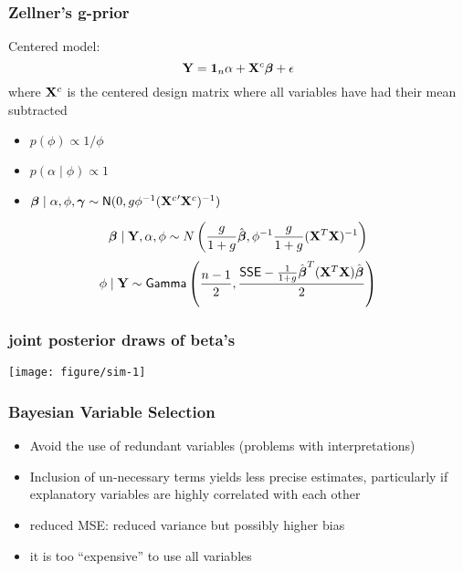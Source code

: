 \documentclass[handout]{beamer}\usepackage[]{graphicx}\usepackage[]{color}
\makeatletter
\def\maxwidth{ %
  \ifdim\Gin@nat@width>\linewidth
    \linewidth
  \else
    \Gin@nat@width
  \fi
}
\newenvironment{knitrout}{}{} %
\makeatother
\begin{document}
\begin{frame}\frametitle{Zellner's g-prior}
  Centered model:  $$\mathbf{Y} = \mathbf{1}_n \alpha + \mathbf{X}^c \boldsymbol{\beta} + \epsilon$$
  where $\mathbf{X}^c$ is the centered design matrix where all variables have
  had their mean subtracted \pause
\begin{itemize}
\item  $p(\phi) \propto 1/\phi$  \pause
\item   $p(\alpha \mid \phi) \propto 1$ \pause
\item  $\boldsymbol{\beta} \mid \alpha, \phi, \boldsymbol{\gamma} \sim \textsf{N}(0, g \phi^{-1}
  ({\mathbf{X}^c}^\prime \mathbf{X}^c)^{-1})$ \pause
\end{itemize}

$$\boldsymbol{\beta} \mid \mathbf{Y}, \alpha, \phi \sim N\left(\frac{g}{1 + g} \hat{\boldsymbol{\beta}}, \phi^{-1}\frac{g}{1 + g} (\mathbf{X}^T\mathbf{X})^{-1} \right)$$
$$ \phi \mid \mathbf{Y} \sim \textsf{Gamma} \left(\frac{n-1}{2}, \frac{\textsf{SSE} - \frac{1}{1 + g} \hat{\boldsymbol{\beta}}^T (\mathbf{X}^T\mathbf{X}) \hat{\boldsymbol{\beta}}}{2} \right) $$
\end{frame}

\begin{frame} \frametitle{joint posterior draws of beta's}
\begin{knitrout}
\color{fgcolor}

{\centering \texttt{[image: figure/sim-1]} 

}



\end{knitrout}

\end{frame}


\begin{frame} \frametitle{Bayesian Variable Selection}
  \begin{itemize}
   \item Avoid the use of redundant variables (problems with
    interpretations) \pause
   \item Inclusion of un-necessary terms yields less precise
  estimates, particularly if explanatory variables are highly
  correlated with each other \pause
  \item reduced MSE: reduced variance but possibly higher bias
  \item it is too ``expensive'' to use all variables
  \end{itemize}
\end{frame}
\end{document}
